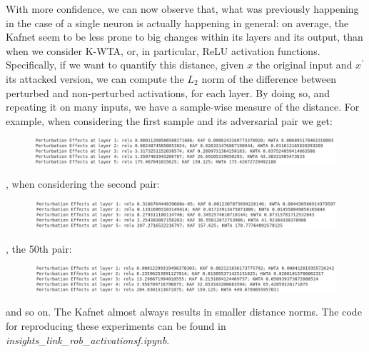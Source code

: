 \documentclass[LaM,binding=0.6cm]{./packages/sapthesis/sapthesis}
\begin{document}
        
        \newpage
        With more confidence, we can now observe that, what was previously happening in the case of a single neuron is actually happening in general: on average,
        the Kafnet seem to be less prone to big changes within its layers and its output, than when we consider K-WTA, or, in particular, ReLU activation functions.  
        Specifically, if we want to quantify this distance, given $x$ the original input and $x^{\prime}$ its attacked version, we can compute the $L_2$ norm of the difference between perturbed 
        and non-perturbed activations, for each layer. By doing so, and repeating it on many inputs, we have a sample-wise measure of the distance. For example, when considering the first sample and its adversarial pair we get:
        \begin{figure}[h!!]
            \centering
            \includegraphics[width=1.0\textwidth]{actdist31}
        \end{figure}
       \newline
        , when considering the second pair:
        \begin{figure}[h!!]
            \centering
            \includegraphics[width=1.0\textwidth]{actdist32}
        \end{figure}
        \newline
        , the 50th pair:
        \begin{figure}[h!!]
            \centering
            \includegraphics[width=1.0\textwidth]{actdist33}
        \end{figure}
        \newline
        and so on. The Kafnet almost always results in smaller distance norms. The code for reproducing these experiments can be found in \textit{insights\_link\_rob\_activationsf.ipynb}.
\end{document}
